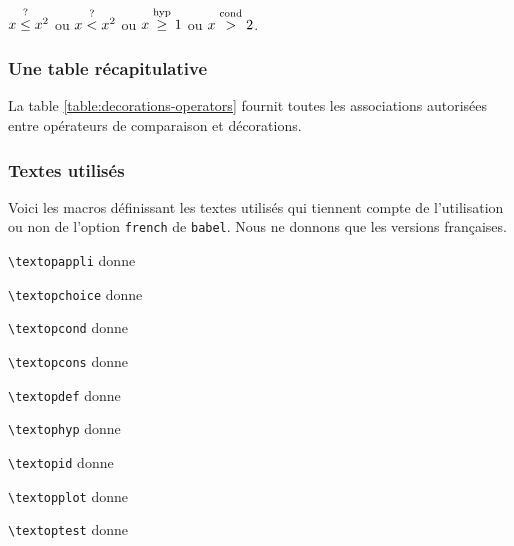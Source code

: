 \documentclass[12pt,a4paper]{article}
\newcommand\env[1]{\texttt{#1}}
\newcommand\macro[1]{\env{\textbackslash{}#1}}
\theoremstyle{definition}
\begin{document}
\begin{latexex}
$x \leqtest x^2$ ou $x \ltest x^2$ ou
$x \geqhyp 1$ ou $x \gcond 2$.
\end{latexex}




\subsubsection{Une table récapitulative}

La table \ref{table:decorations-operators}  fournit toutes les associations autorisées entre opérateurs de comparaison et décorations.




\subsubsection{Textes utilisés} \label{text-for-opes}

Voici les macros définissant les textes utilisés qui tiennent compte de l'utilisation ou non de l'option \verb+french+ de \verb+babel+. Nous ne donnons que les versions françaises.

\vspace{-.5em}


\begin{multicols}{2}
    \macro{textopappli} donne \emph{\og \textopappli \fg}

    \macro{textopchoice} donne \emph{\og \textopchoice \fg}

    \macro{textopcond} donne \emph{\og \textopcond \fg}

    \macro{textopcons} donne \emph{\og \textopcons \fg}

    \macro{textopdef} donne \emph{\og \textopdef \fg}

    \macro{textophyp} donne \emph{\og \textophyp \fg}

    \macro{textopid} donne \emph{\og \textopid \fg}

    \macro{textopplot} donne \emph{\og \textopplot \fg}

    \macro{textoptest} donne \emph{\og \textoptest \fg}
\vfill\null\end{multicols}



\end{document}
